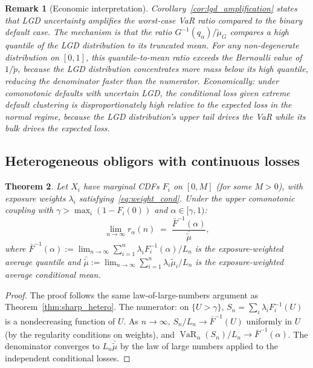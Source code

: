 \documentclass[11pt]{article}
\newtheorem{theorem}{Theorem}[section]
\newtheorem{remark}[theorem]{Remark}
\theoremstyle{definition}
\newcommand{\VaR}{\operatorname{VaR}}
\newcommand{\1}{\mathbf{1}}
\begin{document}
\begin{remark}[Economic interpretation]\label{rem:lgd_econ}
Corollary~\ref{cor:lgd_amplification} states that LGD uncertainty \emph{amplifies} the worst-case VaR ratio compared to the binary default case. The mechanism is that the ratio $G^{-1}(q_\alpha)/\tilde{\mu}_G$ compares a high quantile of the LGD distribution to its truncated mean. For any non-degenerate distribution on $[0,1]$, this quantile-to-mean ratio exceeds the Bernoulli value of $1/\tilde{p}$, because the LGD distribution concentrates more mass below its high quantile, reducing the denominator faster than the numerator. Economically: under comonotonic defaults with uncertain LGD, the \emph{conditional} loss given extreme default clustering is disproportionately high relative to the expected loss in the normal regime, because the LGD distribution's upper tail drives the VaR while its bulk drives the expected loss.
\end{remark}

\subsection{Heterogeneous obligors with continuous losses}

\begin{theorem}\label{thm:lgd_hetero}
Let $X_i$ have marginal CDFs $F_i$ on $[0, M]$ (for some $M > 0$), with exposure weights $\lambda_i$ satisfying~\eqref{eq:weight_cond}. Under the upper comonotonic coupling with $\gamma > \max_i(1 - F_i(0))$ and $\alpha \in [\gamma, 1)$:
\begin{equation}\label{eq:lgd_hetero}
  \lim_{n \to \infty} r_\alpha(n) \;=\; \frac{\bar{F}^{-1}(\alpha)}{\bar{\tilde{\mu}}},
\end{equation}
where $\bar{F}^{-1}(\alpha) := \lim_{n \to \infty} \sum_{i=1}^n \lambda_i F_i^{-1}(\alpha)/L_n$ is the exposure-weighted average quantile and $\bar{\tilde{\mu}} := \lim_{n \to \infty} \sum_{i=1}^n \lambda_i \tilde{\mu}_i / L_n$ is the exposure-weighted average conditional mean.
\end{theorem}

\begin{proof}
The proof follows the same law-of-large-numbers argument as Theorem~\ref{thm:sharp_hetero}. The numerator: on $\{U > \gamma\}$, $S_n = \sum_i \lambda_i F_i^{-1}(U)$ is a nondecreasing function of $U$. As $n \to \infty$, $S_n/L_n \to \bar{F}^{-1}(U)$ uniformly in $U$ (by the regularity conditions on weights), and $\VaR_\alpha(S_n)/L_n \to \bar{F}^{-1}(\alpha)$. The denominator converges to $L_n \bar{\tilde{\mu}}$ by the law of large numbers applied to the independent conditional losses.
\end{proof}
\end{document}
